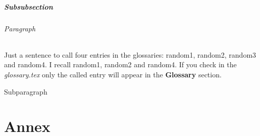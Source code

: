 \documentclass[a4paper, 11pt]{article}
\begin{document}
\subsubsection*{Subsubsection}
\lipsum[9]
\paragraph*{Paragraph}
\lipsum[10]
Just a sentence to call four entries in the glossaries: \gls{random1}, \gls{random2}, \gls{random3} and \gls{random4}.\newline
I recall \gls{random1}, \gls{random2} and \gls{random4}.\newline
If you check in the \textit{glossary.tex} only the called entry will appear in the \textbf{Glossary} section.
\subparagraph*{Subparagraph}
\lipsum[11]

\clearpage
\part*{Annex}
\listoffigures
\listoftables

\clearpage
\printglossary %

\clearpage
\printbibliography
\end{document}
